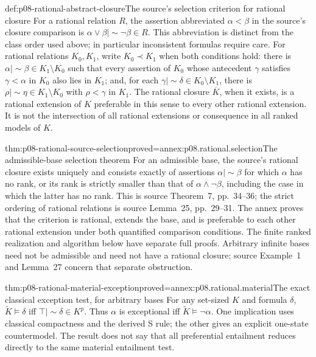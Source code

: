 \begin{hbdefinition}{def:p08-rational-abstract-closure}{The source's selection criterion for rational closure}
For a rational relation \(R\), the assertion abbreviated
\(\alpha<\beta\) in the source's closure comparison is
\(\alpha\vee\beta\mathrel{|\!\sim}\neg\beta\in R\).
This abbreviation is distinct from the class order used above; in
particular inconsistent formulas require care. For rational relations
\(K_0,K_1\), write \(K_0\prec K_1\) when both conditions hold:
there is \(\alpha\mathrel{|\!\sim}\beta\in K_1\setminus K_0\)
such that every assertion of \(K_0\) whose antecedent \(\gamma\)
satisfies \(\gamma<\alpha\) in \(K_0\) also lies in \(K_1\);
and, for each \(\gamma\mathrel{|\!\sim}\delta\in K_0\setminus K_1\),
there is \(\rho\mathrel{|\!\sim}\eta\in K_1\setminus K_0\)
with \(\rho<\gamma\) in \(K_1\).
The rational closure \(\overline K\), when it exists, is a rational
extension of \(K\) preferable in this sense to every other rational
extension. It is not the intersection of all rational extensions or
consequence in all ranked models of \(K\).
\end{hbdefinition}

\begin{hbtheorem}{thm:p08-rational-source-selection}{proved=annex:p08.rational.selection}{The admissible-base selection theorem}
For an admissible base, the source's rational closure exists uniquely and consists
exactly of assertions \(\alpha\mathrel{|\!\sim}\beta\) for
which \(\alpha\) has no rank, or its rank is strictly smaller than
that of \(\alpha\wedge\neg\beta\), including the case in which
the latter has no rank. This is source Theorem~7, pp.~34--36; the
strict ordering of rational relations is source Lemma~25, pp.~29--31.
The annex proves that the criterion is rational, extends the base, and
is preferable to each other rational extension under both quantified
comparison conditions. The finite ranked realization and algorithm
below have separate full proofs. Arbitrary infinite bases need not be
admissible and need not
have a rational closure; source Example~1 and Lemma~27 concern that
separate obstruction.
\end{hbtheorem}

\begin{hbtheorem}{thm:p08-rational-material-exception}{proved=annex:p08.rational.material}{The exact classical exception test, for arbitrary bases}
For any set-sized \(K\) and formula \(\delta\),
\(\widetilde K\models\delta\) iff
\(\top\mathrel{|\!\sim}\delta\in K^p\).
Thus \(\alpha\) is exceptional iff
\(\widetilde K\models\neg\alpha\).
One implication uses classical compactness and the derived S rule;
the other gives an explicit one-state countermodel. The result does
not say that all preferential entailment reduces directly to the same
material entailment test.
\end{hbtheorem}


